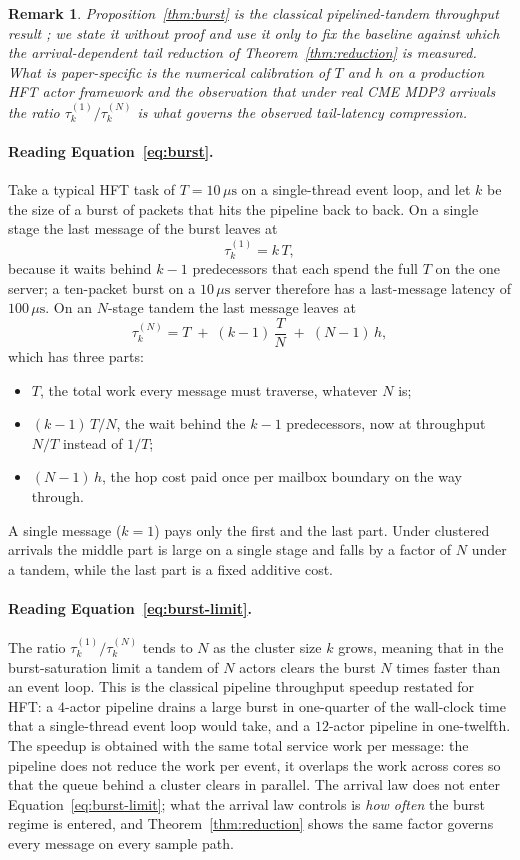 \documentclass[11pt]{article}
\newtheorem{remark}{Remark}[section]
\begin{document}
\begin{remark}
Proposition~\ref{thm:burst} is the classical pipelined-tandem throughput result
\citep{kleinrock1976,kelly1979}; we state it without proof and use it only to fix the
baseline against which the arrival-dependent tail reduction of Theorem~\ref{thm:reduction}
is measured. What is paper-specific is the numerical calibration of $T$ and $h$ on a
production HFT actor framework and the observation that under real CME MDP3 arrivals the
ratio $\tau_k^{(1)}/\tau_k^{(N)}$ is what governs the observed tail-latency compression.
\end{remark}

\paragraph{Reading Equation~\eqref{eq:burst}.} Take a typical HFT task of
$T = 10\,\mu\mathrm{s}$ on a single-thread event loop, and let $k$ be the size of a burst
of packets that hits the pipeline back to back. On a single stage the last message of the
burst leaves at
\[
\tau_k^{(1)} = k\,T ,
\]
because it waits behind $k-1$ predecessors that each spend the full $T$ on the one server;
a ten-packet burst on a $10\,\mu\mathrm{s}$ server therefore has a last-message latency of
$100\,\mu\mathrm{s}$. On an $N$-stage tandem the last message leaves at
\[
\tau_k^{(N)} = T \;+\; (k-1)\,\frac{T}{N} \;+\; (N-1)\,h ,
\]
which has three parts:
\begin{itemize}
    \item $T$, the total work every message must traverse, whatever $N$ is;
    \item $(k-1)\,T/N$, the wait behind the $k-1$ predecessors, now at throughput $N/T$
instead of $1/T$;
    \item $(N-1)\,h$, the hop cost paid once per mailbox boundary on the way through.
\end{itemize}
A single message ($k = 1$) pays only the first and the last part. Under clustered arrivals
the middle part is large on a single stage and falls by a factor of $N$ under a tandem,
while the last part is a fixed additive cost.

\paragraph{Reading Equation~\eqref{eq:burst-limit}.} The ratio $\tau_k^{(1)}/\tau_k^{(N)}$
tends to $N$ as the cluster size $k$ grows, meaning that in the burst-saturation limit a
tandem of $N$ actors clears the burst $N$ times faster than an event loop. This is the
classical pipeline throughput speedup restated for HFT: a $4$-actor pipeline drains a
large burst in one-quarter of the wall-clock time that a single-thread event loop would
take, and a $12$-actor pipeline in one-twelfth. The speedup is obtained with the same
total service work per message: the pipeline does not reduce the work per event, it
overlaps the work across cores so that the queue behind a cluster clears in parallel. The arrival law does not enter
Equation~\eqref{eq:burst-limit}; what the arrival law controls is \emph{how often} the
burst regime is entered, and Theorem~\ref{thm:reduction} shows the same factor governs
every message on every sample path.
\end{document}

